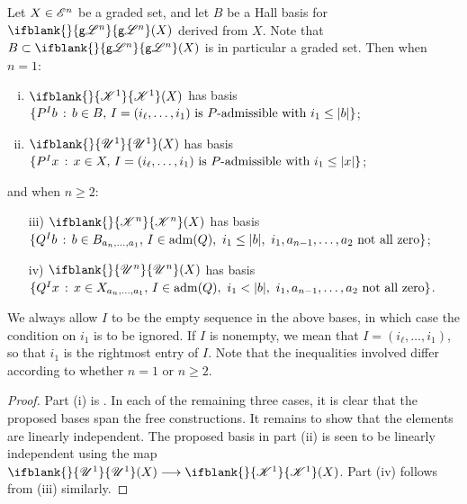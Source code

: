 \documentclass[11pt]{article}
\newcommand{\GS}[1]{\scrE^{#1}}
\newcommand{\GoodLie}[1]{\mathsf{g}{\scrL}^{#1}}%
\newcommand{\LL}[1]{{\scrK}^{#1}}%
\newcommand{\nontop}[1]{\scrU^{#1}}%
\newcommand{\admis}[1]{\mathrm{adm}(#1)}%
\newcommand{\Fr}[2][]{\ifblank{#1}{#2}{#2_{#1}}}
\renewcommand{\Q}{Q}
\begin{document}
\begin{CategoriesOfInterest}
\begin{prop*}
Let $X\in\GS{n}$ be a graded set, and let $B$ be a Hall basis for $\Fr{\GoodLie{n}}(X)$ derived from $X$. Note that $B\subset \Fr{\GoodLie{n}}(X)$ is in particular a graded set. Then when $n=1$:
\begin{enumerate}[i)]\squishlist
\setlength{\parindent}{.25in}
\item $\Fr{\LL{1}}(X)$ has basis $\{P^Ib\,:\,b\in B,\,I=(i_\ell,\ldots,i_1)\textup{ is $P$-admissible with }i_1\leq|b| \}$;
\item $\Fr{\nontop{1}}(X)$ has basis $\{P^Ix\,:\,x\in X,\,I=(i_\ell,\ldots,i_1)\textup{ is $P$-admissible with }i_1\leq|x| \}$;
\end{enumerate}
and when $n\geq2$:
\begin{enumerate}[i)]\squishlist
\setlength{\parindent}{.25in}
\item[iii)] $\Fr{\LL{n}}(X)$ has basis $\{\Q^Ib\,:\,b\in B_{a_{n},\ldots,a_1},\,I\in\admis{\Q},\ i_1\leq|b|,\ i_1,a_{n-1},\ldots,a_2\textup{ not all zero}\}$;
\item[iv)] $\Fr{\nontop{n}}(X)$ has basis $\{\Q^Ix\,:\,x\in X_{a_{n},\ldots,a_1},\,I\in\admis{\Q},\ i_1<|b|,\ i_1,a_{n-1},\ldots,a_2\textup{ not all zero}\}$.
\end{enumerate}
We always allow $I$ to be the empty sequence in the above bases, in which case the condition on $i_{1}$ is to be ignored. If $I$ is nonempty, we mean that $I=(i_\ell,\ldots,i_1)$, so that $i_{1}$ is the rightmost entry of $I$.
Note that the inequalities involved differ according to whether $n=1$ or $n\geq2$.
\end{prop*}
%
\begin{proof}
Part (i) is \cite[Thm F, p.15]{MR1089001}.
In each of the remaining three cases, it is clear that the proposed bases span the free constructions. It remains to show that the elements are linearly independent.
The proposed basis in part (ii) is seen to be linearly independent using the map $\Fr{\nontop{1}}(X)\to \Fr{\LL{1}}(X)$. Part (iv) follows from (iii) similarly.


\end{proof}
\end{CategoriesOfInterest}
\end{document}
